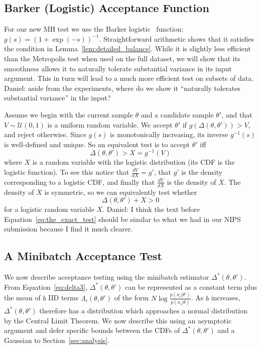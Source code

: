 \documentclass{article}
\begin{document}
\subsection{Barker (Logistic) Acceptance Function}\label{ssec:barker_function}
For our new MH test we use the Barker logistic~\cite{Barker65} function:
$g(s)=(1+\exp(-s))^{-1}$. Straightforward arithmetic shows that it satisfies the
condition in Lemma~\ref{lem:detailed_balance}.  While it is slightly less
efficient than the Metropolis test when used on the full dataset, we will show
that its smoothness allows it to naturally tolerate substantial variance in its
input argument. This in turn will lead to a much more efficient test on subsets
of data. {\color{blue} Daniel: aside from the experiments, where do we show it
``naturally tolerates substantial variance'' in the input?} 

Assume we begin with the current sample $\theta$ and a candidate sample
$\theta'$, and that $V \sim \mathcal{U}(0,1)$ is a uniform random variable. We
accept $\theta'$ if $g(\Delta(\theta,\theta')) > V$, and reject otherwise.
Since $g(s)$ is monotonically increasing, its inverse $g^{-1}(s)$ is
well-defined and unique. So an equivalent test is to accept $\theta'$ iff
\begin{equation}\label{eq:equivalent_test}
    \Delta(\theta,\theta') > X = g^{-1}(V)
\end{equation}
where $X$ is a random variable with the logistic distribution (its CDF is the
logistic function). To see this notice that $\frac{dV}{dX} = g'$, that $g'$ is
the density corresponding to a logistic CDF, and finally that $\frac{dV}{dX}$ is
the density of $X$. The density of $X$ is symmetric, so we can equivalently test
whether
\begin{equation}\label{eq:the_exact_test}
    \Delta(\theta,\theta') + X > 0
\end{equation}
for a logistic random variable $X$. {\color{blue} Daniel: I think the text
before Equation~\ref{eq:the_exact_test} should be similar to what we had in our
NIPS submission because I find it much clearer.}


\subsection{A Minibatch Acceptance Test}\label{ssec:deltas_minibatch}

We now describe acceptance testing using the minibatch estimator
$\Delta^*(\theta,\theta')$. From Equation~\ref{eq:delta3},
$\Delta^*(\theta,\theta')$ can be represented as a constant term plus the mean
of $b$ IID terms $\Lambda_i(\theta,\theta')$ of the form
$N\log\frac{p(x_i|\theta')}{p(x_i|\theta)}$. As $b$ increases,
$\Delta^*(\theta,\theta')$ therefore has a distribution which approaches a
normal distribution by the Central Limit Theorem. We now describe this using an
asymptotic argument and defer specific bounds between the CDFs of
$\Delta^*(\theta,\theta')$ and a Gaussian to Section~\ref{sec:analysis}.
\end{document}
